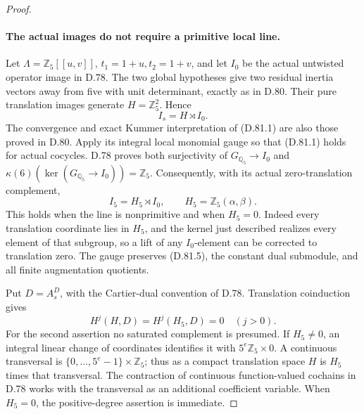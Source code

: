 \begin{proof}
\paragraph{The actual images do not require a primitive local line.}
Let \(\Lambda=\mathbb Z_5[[u,v]]\), \(t_1=1+u,t_2=1+v\), and let
\(I_0\) be the actual untwisted operator image in D.78.
The two global hypotheses give two residual inertia vectors away
from five with unit determinant, exactly as in D.80. Their pure
translation images generate \(H=\mathbb Z_5^2\). Hence
\[
                         I_s=H\rtimes I_0.             \tag{D.81.5}
\]
The convergence and exact Kummer interpretation of (D.81.1) are
also those proved in D.80. Apply its integral local monomial gauge
so that (D.81.1) holds for actual cocycles. D.78 proves both
surjectivity of \(G_{\mathbb Q_5}\to I_0\) and
\(\kappa(6)(\ker(G_{\mathbb Q_5}\to I_0))=\mathbb Z_5\).
Consequently, with its actual zero-translation complement,
\[
 I_5=H_5\rtimes I_0,\qquad
 H_5=\mathbb Z_5(\alpha,\beta).                         \tag{D.81.6}
\]
This holds when the line is nonprimitive and when \(H_5=0\).
Indeed every translation coordinate lies in \(H_5\), and the
kernel just described realizes every element of that subgroup,
so a lift of any \(I_0\)-element can be corrected to translation zero.
The gauge preserves (D.81.5), the constant dual submodule, and
all finite augmentation quotients.

Put \(D=A_s^D\), with the Cartier-dual convention of D.78.
Translation coinduction gives
\[
 H^j(H,D)=H^j(H_5,D)=0\quad(j>0).                       \tag{D.81.7}
\]
For the second assertion no saturated complement is presumed.
If \(H_5\ne0\), an integral linear change of coordinates identifies
it with \(5^e\mathbb Z_5\times0\). A continuous transversal is
\(\{0,\ldots,5^e-1\}\times\mathbb Z_5\); thus as a compact
translation space \(H\) is \(H_5\) times that transversal.
The contraction of continuous function-valued cochains in D.78
works with the transversal as an additional coefficient variable.
When \(H_5=0\), the positive-degree assertion is immediate.


\end{proof}
